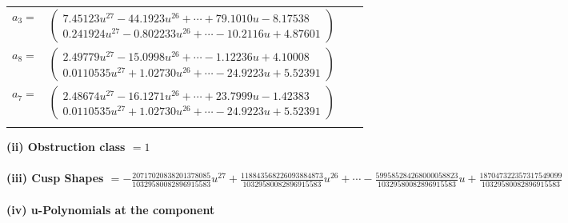 \documentclass[1p]{elsarticle_modified}
\theoremstyle{definition}
\begin{document}
\begin{tabular}{m{7pt} m{180pt} m{7pt} m{180pt} }
\flushright $a_{3}=$&$\begin{pmatrix}7.45123 u^{27}-44.1923 u^{26}+\cdots+79.1010 u-8.17538\\0.241924 u^{27}-0.802233 u^{26}+\cdots-10.2116 u+4.87601\end{pmatrix}$ \\
\flushright $a_{8}=$&$\begin{pmatrix}2.49779 u^{27}-15.0998 u^{26}+\cdots-1.12236 u+4.10008\\0.0110535 u^{27}+1.02730 u^{26}+\cdots-24.9223 u+5.52391\end{pmatrix}$ \\
\flushright $a_{7}=$&$\begin{pmatrix}2.48674 u^{27}-16.1271 u^{26}+\cdots+23.7999 u-1.42383\\0.0110535 u^{27}+1.02730 u^{26}+\cdots-24.9223 u+5.52391\end{pmatrix}$\\&\end{tabular}
\flushleft \textbf{(ii) Obstruction class $= 1$}\\~\\
\flushleft \textbf{(iii) Cusp Shapes $= -\frac{20717020838201378085}{10329580082896915583} u^{27}+\frac{118843568226093884873}{10329580082896915583} u^{26}+\cdots-\frac{599585284268000058823}{10329580082896915583} u+\frac{187047322357317549099}{10329580082896915583}$}\\~\\
\newpage\renewcommand{\arraystretch}{1}
\flushleft \textbf{(iv) u-Polynomials at the component}\newline \\
\end{document}
